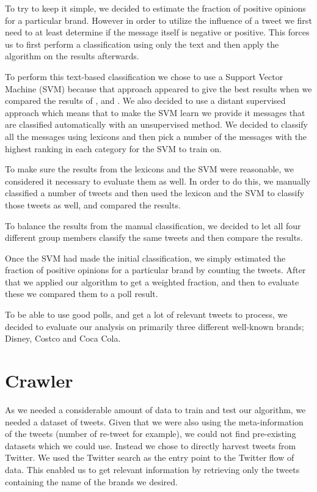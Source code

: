 \documentclass[a4paper,12pt]{report}
\begin{document}
To try to keep it simple, we decided to estimate the fraction of positive opinions for a particular brand.
However in order to utilize the influence of a tweet we first need to at least determine if the message itself is negative or positive.
This forces us to first perform a classification using only the text and then apply the algorithm on the results afterwards.

To perform this text-based classification we chose to use a Support Vector Machine (SVM) because that approach appeared to give the best results when we compared the results of \cite{Pang02}, \cite{Turney02} and \cite{Taboada10}.
We also decided to use a distant supervised approach which means that to make the SVM learn we provide it messages that are classified automatically with an unsupervised method.
We decided to classify all the messages using lexicons and then pick a number of the messages with the highest ranking in each category for the SVM to train on.

To make sure the results from the lexicons and the SVM were reasonable, we considered it necessary to evaluate them as well. 
In order to do this, we manually classified a number of tweets and then used the lexicon and the SVM to classify those tweets as well, and compared the results.

To balance the results from the manual classification, we decided to let all four different group members classify the same tweets and then compare the results.

Once the SVM had made the initial classification, we simply estimated the fraction of positive opinions for a particular brand by counting the tweets. After that we applied our algorithm to get a weighted fraction, and then to evaluate these we compared them to a poll result.

To be able to use good polls, and get a lot of relevant tweets to process, we decided to evaluate our analysis on primarily three different well-known brands; Disney, Costco and Coca Cola.

\section{Crawler}

As we needed a considerable amount of data to train and test our algorithm, we needed a dataset of tweets. 
Given that we were also using the meta-information of the tweets (number of re-tweet for example), we could not find pre-existing datasets which we could use.
Instead we chose to directly harvest tweets from Twitter.
We used the Twitter search as the entry point to the Twitter flow of data. 
This enabled us to get relevant information by retrieving only the tweets containing the name of the brands we desired.
\end{document}
